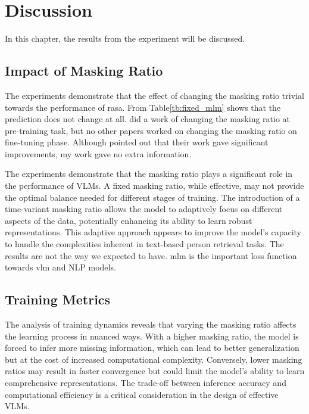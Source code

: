
\chapter{Discussion}
In this chapter, the results from the experiment will be discussed.

\section{Impact of Masking Ratio}

The experiments demonstrate that the effect of changing the masking ratio trivial towards the performance of \acrshort{rasa}. From Table\ref{tb:fixed_mlm} shows that the prediction does not change at all. \cite{yang2023learningbettermaskingbetter} did a work of changing the masking ratio at pre-training task, but no other papers worked on changing the masking ratio on fine-tuning phase. 
Although \cite{yang2023learningbettermaskingbetter} pointed out that their work gave significant improvements, my work gave no extra information. 

The experiments demonstrate that the masking ratio plays a significant role in the performance of VLMs. A fixed masking ratio, while effective, may not provide the optimal balance needed for different stages of training. The introduction of a time-variant masking ratio allows the model to adaptively focus on different aspects of the data, potentially enhancing its ability to learn robust representations. This adaptive approach appears to improve the model's capacity to handle the complexities inherent in text-based person retrieval tasks.
The results are not the way we expected to have. \acrshort{mlm} is the important loss function towards \acrshort{vlm} and NLP models. 


\section{Training Metrics}

The analysis of training dynamics reveals that varying the masking ratio affects the learning process in nuanced ways. With a higher masking ratio, the model is forced to infer more missing information, which can lead to better generalization but at the cost of increased computational complexity. Conversely, lower masking ratios may result in faster convergence but could limit the model's ability to learn comprehensive representations. The trade-off between inference accuracy and computational efficiency is a critical consideration in the design of effective VLMs.

